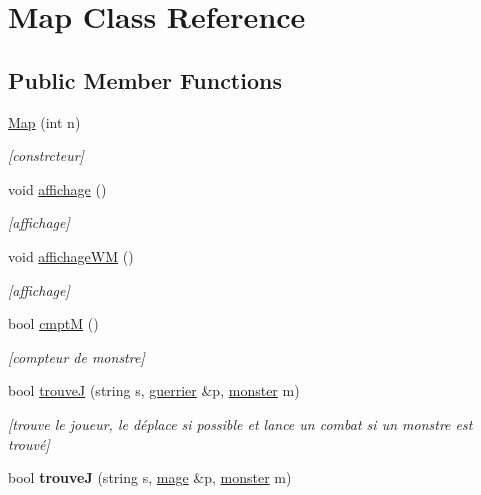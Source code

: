 \hypertarget{class_map}{}\section{Map Class Reference}
\label{class_map}
\subsection*{Public Member Functions}
\begin{DoxyCompactItemize}
\item 
\hyperlink{class_map_a18c4777be15d4d5080da8dbf7e549207}{Map} (int n)
\begin{DoxyCompactList}\small\item\em \mbox{[}constrcteur\mbox{]} \end{DoxyCompactList}\item 
void \hyperlink{class_map_a3426a949e89c1808e2a359fb125635ac}{affichage} ()
\begin{DoxyCompactList}\small\item\em \mbox{[}affichage\mbox{]} \end{DoxyCompactList}\item 
void \hyperlink{class_map_a1405dd0cf769dc6b37a44c68c27e57b8}{affichage\+WM} ()
\begin{DoxyCompactList}\small\item\em \mbox{[}affichage\mbox{]} \end{DoxyCompactList}\item 
bool \hyperlink{class_map_a7744f9a658937dbbe1b0d35ae6a56a95}{cmptM} ()
\begin{DoxyCompactList}\small\item\em \mbox{[}compteur de monstre\mbox{]} \end{DoxyCompactList}\item 
bool \hyperlink{class_map_a382f1040f930d601c907997453a63cf9}{trouveJ} (string s, \hyperlink{classguerrier}{guerrier} \&p, \hyperlink{classmonster}{monster} m)
\begin{DoxyCompactList}\small\item\em \mbox{[}trouve le joueur, le déplace si possible et lance un combat si un monstre est trouvé\mbox{]} \end{DoxyCompactList}\item 
bool {\bfseries trouveJ} (string s, \hyperlink{classmage}{mage} \&p, \hyperlink{classmonster}{monster} m)\hypertarget{class_map_a0e99e7c9b7df51ca5e6c282125fb5345}{}\label{class_map_a0e99e7c9b7df51ca5e6c282125fb5345}


\end{DoxyCompactItemize}
